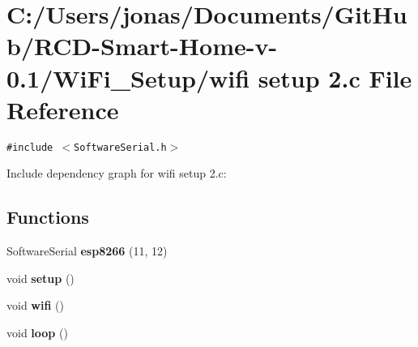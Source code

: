 \section{C:/Users/jonas/Documents/Git\-Hub/RCD-Smart-Home-v-0.1/Wi\-Fi\_\-Setup/wifi setup 2.c File Reference}
\label{wifi_01setup_012_8c}
{\tt \#include $<$Software\-Serial.h$>$}\par


Include dependency graph for wifi setup 2.c:\subsection*{Functions}
\begin{CompactItemize}
\item 
Software\-Serial {\bf esp8266} (11, 12)
\item 
void {\bf setup} ()
\item 
void {\bf wifi} ()
\item 
void {\bf loop} ()
\end{CompactItemize}
